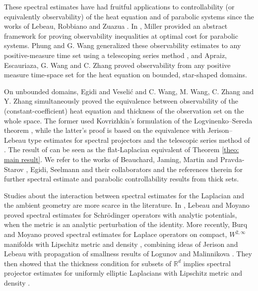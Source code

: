 \documentclass[letterpaper,11pt]{amsart}
\theoremstyle{note}
\numberwithin{equation}{section}
\begin{document}
These spectral estimates have had fruitful applications to controllability (or equivalently observability) of the heat equation and of parabolic systems since the works of Lebeau, Robbiano and Zuazua \cite{lebeaurobbiano1995controlechaleur, lebeauzuazua1998thermoelasticity}. In \cite{miller2010directlebeaurobbiano}, Miller provided an abstract framework for proving observability inequalities at optimal cost for parabolic systems. Phung and G. Wang generalized these observability estimates to any positive-measure time set using a telescoping series method \cite{phungwang2013observability}, and Apraiz, Escauriaza, G. Wang and C. Zhang \cite{apraizescauriaza2013nullcontrol, apraizescauriazawangzhang2014observability} proved observability from any positive measure time-space set for the heat equation on bounded, star-shaped domains.

On unbounded domains, Egidi and Veseli{\'c} \cite{egidiveselic2018controlheat} and C. Wang, M. Wang, C. Zhang and Y. Zhang \cite{wangwangzhangzhang2019spectralineq_heat} simultaneously proved the equivalence between observability of the (constant-coefficient) heat equation and thickness of the observation set on the whole space. The former used Kovrizhkin's formulation of the Logvinenko--Sereda theorem \cite{kovrizhkin2000fourier,kovrizhkin2001relatedtoLog-Ser}, while the latter's proof is based on the equivalence with Jerison--Lebeau type estimates for spectral projectors and the telescopic series method of \cite{phungwang2013observability}. The result of \cite{wangwangzhangzhang2019spectralineq_heat} can be seen as the flat-Laplacian equivalent of Theorem \ref{theo: main result}. We refer to the works of Beauchard, Jaming, Martin and Pravda-Starov \cite{beauchardjamingpravda-starov2021spectral, martinpravda-starov2023spectral}, Egidi, Seelmann and their collaborators \cite{egidiseelmann2021Logv-Seredatype, egidinakicseelmann+2020heatequation} and the references therein for further spectral estimate and parabolic controllability results from thick sets.

Studies about the interaction between spectral estimates for the Laplacian and the ambient geometry are more scarce in the literature. In \cite{lebeaumoyano2019spectralinequalities}, Lebeau and Moyano proved spectral estimates for Schrödinger operators with analytic potentials, when the metric is an analytic perturbation of the identity. More recently, Burq and Moyano proved spectral estimates for Laplace operators on compact, $W^{2,\infty}$ manifolds with Lipschitz metric and density \cite{burqmoyano2023propagationheat}, combining ideas of Jerison and Lebeau \cite{jerisonlebeau1999nodal} with propagation of smallness results of Logunov and Malinnikova \cite{logunovmalinnikova2018qtttve_propag_smallness}. They then showed that the thickness condition for subsets of $\mathbb{R}^d$ implies spectral projector estimates for uniformly elliptic Laplacians with Lipschitz metric and density \cite{burqmoyano2021spectralestimates}.
\end{document}
